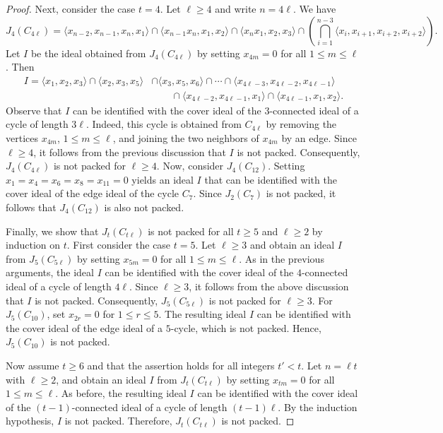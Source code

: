 \documentclass[12pt]{amsart}
\begin{document}
\begin{proof}
Next, consider the case $t=4$. Let $\ell \ge 4$ and write $n=4\ell$. We have 
\[
J_4(C_{4\ell})= \langle x_{n-2},x_{n-1},x_n,x_1 \rangle \cap \langle x_{n-1}x_{n},x_1,x_2 \rangle
\cap \langle x_{n}x_{1},x_2,x_3 \rangle
\cap \left( \bigcap_{i=1}^{n-3} \langle x_i,x_{i+1},x_{i+2}, x_{i+2} \rangle \right).
\]
Let $I$ be the ideal obtained from $J_4(C_{4\ell})$ by setting
$x_{4m}=0$ for all $1\le m\le \ell$. Then
\[
\begin{aligned}
I = \langle x_1,x_2,x_3\rangle
\cap \langle x_2,x_3,x_5\rangle
& \cap \langle x_3,x_5,x_6\rangle
\cap \cdots
\cap \langle x_{4\ell-3},x_{4\ell-2},x_{4\ell-1}\rangle \\
&\qquad \cap \langle x_{4\ell-2},x_{4\ell-1},x_1\rangle
\cap \langle x_{4\ell-1},x_1,x_2\rangle .
\end{aligned}
\]
Observe that $I$ can be identified with the cover ideal of the
$3$-connected ideal of a cycle of length $3\ell$. Indeed, this cycle is obtained from $C_{4\ell}$ by removing the vertices $x_{4m}$,
$1\le m\le \ell$, and joining the two neighbors of $x_{4m}$ by an edge. Since $\ell\ge4$, it follows from the previous discussion that $I$ is not packed. Consequently, $J_4(C_{4\ell})$ is not packed for $\ell\ge4$. Now, consider $J_4(C_{12})$. Setting $x_1=x_4=x_6=x_8=x_{11}=0$ yields an ideal $I$ that can be identified with the cover ideal of the edge ideal of the cycle $C_7$. Since $J_2(C_7)$ is not packed, it follows that $J_4(C_{12})$ is also not packed.

Finally, we show that $J_t(C_{t \ell })$ is not packed for all $t\ge 5$ and $\ell\ge 2$ by induction on $t$. First consider the case $t=5$. Let $\ell\ge 3$ and obtain an ideal $I$ from $J_5(C_{5\ell})$ by setting $x_{5m}=0$ for all $1\le m\le \ell$. As in the previous arguments, the ideal $I$ can be identified with the cover ideal of the $4$-connected ideal of a cycle of length $4\ell$. Since $\ell\ge 3$, it follows from the above discussion that $I$ is not packed. Consequently, $J_5(C_{5\ell})$ is not packed for $\ell\ge 3$. For $J_5(C_{10})$, set $x_{2r}=0$ for $1\le r\le 5$. The resulting ideal $I$ can be identified with the cover ideal of the edge ideal of a $5$-cycle, which is not packed. Hence, $J_5(C_{10})$ is not packed.

Now assume $t\ge 6$ and that the assertion holds for all integers $t'<t$. Let $n=\ell t$ with $\ell\ge 2$, and obtain an ideal $I$ from $J_t(C_{t \ell})$ by setting $x_{tm}=0$ for all $1\le m\le \ell$. As before, the resulting ideal $I$ can be identified with the cover ideal of the $(t-1)$-connected ideal of a cycle of length ${(t-1)\ell}$. By the induction hypothesis, $I$ is not packed. Therefore, $J_t(C_{t\ell})$ is not packed.
\end{proof}
\end{document}
